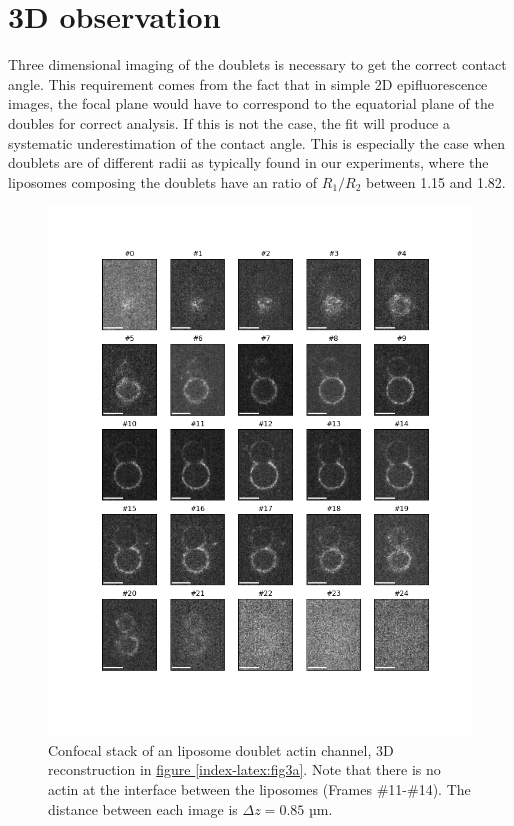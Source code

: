 \documentclass[A4paperpaper,11pt,english]{sphinxmanual}
\begin{document}
\section{3D observation}
\label{index-latex:d-observation}\label{index-latex:d-obs}
Three dimensional imaging of the doublets is necessary to get the correct
contact angle. This requirement comes from the fact that in simple 2D epifluorescence
images, the focal plane would have to correspond to the equatorial plane of the doubles for correct analysis. If
this is not the case, the fit will produce a systematic underestimation of the contact angle.
This is especially the case when doublets are of different radii as typically found in our
experiments, where the liposomes composing the doublets have an ratio of \(R_1 / R_2\) between 1.15 and 1.82.
\begin{figure}[htbp]
\centering
\capstart

\includegraphics[width=0.900\linewidth]{light_table.png}
\caption{Confocal stack of an liposome doublet actin channel, 3D reconstruction in
\hyperref[index-latex:fig3a]{figure  \ref*{index-latex:fig3a}}. Note that there is no actin at the interface between
the liposomes (Frames \#11-\#14). The distance between each image is \(\Delta z=0.85\) µm.}\label{index-latex:confocal-stack}\end{figure}
\end{document}
